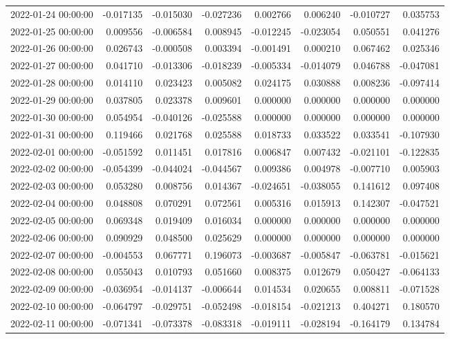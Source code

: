 \begin{tabular}{lrrrrrrr}
2022-01-24 00:00:00 & -0.017135 & -0.015030 & -0.027236 & 0.002766 & 0.006240 & -0.010727 & 0.035753 \\
2022-01-25 00:00:00 & 0.009556 & -0.006584 & 0.008945 & -0.012245 & -0.023054 & 0.050551 & 0.041276 \\
2022-01-26 00:00:00 & 0.026743 & -0.000508 & 0.003394 & -0.001491 & 0.000210 & 0.067462 & 0.025346 \\
2022-01-27 00:00:00 & 0.041710 & -0.013306 & -0.018239 & -0.005334 & -0.014079 & 0.046788 & -0.047081 \\
2022-01-28 00:00:00 & 0.014110 & 0.023423 & 0.005082 & 0.024175 & 0.030888 & 0.008236 & -0.097414 \\
2022-01-29 00:00:00 & 0.037805 & 0.023378 & 0.009601 & 0.000000 & 0.000000 & 0.000000 & 0.000000 \\
2022-01-30 00:00:00 & 0.054954 & -0.040126 & -0.025588 & 0.000000 & 0.000000 & 0.000000 & 0.000000 \\
2022-01-31 00:00:00 & 0.119466 & 0.021768 & 0.025588 & 0.018733 & 0.033522 & 0.033541 & -0.107930 \\
2022-02-01 00:00:00 & -0.051592 & 0.011451 & 0.017816 & 0.006847 & 0.007432 & -0.021101 & -0.122835 \\
2022-02-02 00:00:00 & -0.054399 & -0.044024 & -0.044567 & 0.009386 & 0.004978 & -0.007710 & 0.005903 \\
2022-02-03 00:00:00 & 0.053280 & 0.008756 & 0.014367 & -0.024651 & -0.038055 & 0.141612 & 0.097408 \\
2022-02-04 00:00:00 & 0.048808 & 0.070291 & 0.072561 & 0.005316 & 0.015913 & 0.142307 & -0.047521 \\
2022-02-05 00:00:00 & 0.069348 & 0.019409 & 0.016034 & 0.000000 & 0.000000 & 0.000000 & 0.000000 \\
2022-02-06 00:00:00 & 0.090929 & 0.048500 & 0.025629 & 0.000000 & 0.000000 & 0.000000 & 0.000000 \\
2022-02-07 00:00:00 & -0.004553 & 0.067771 & 0.196073 & -0.003687 & -0.005847 & -0.063781 & -0.015621 \\
2022-02-08 00:00:00 & 0.055043 & 0.010793 & 0.051660 & 0.008375 & 0.012679 & 0.050427 & -0.064133 \\
2022-02-09 00:00:00 & -0.036954 & -0.014137 & -0.006644 & 0.014534 & 0.020655 & 0.008811 & -0.071528 \\
2022-02-10 00:00:00 & -0.064797 & -0.029751 & -0.052498 & -0.018154 & -0.021213 & 0.404271 & 0.180570 \\
2022-02-11 00:00:00 & -0.071341 & -0.073378 & -0.083318 & -0.019111 & -0.028194 & -0.164179 & 0.134784 \\

\end{tabular}
